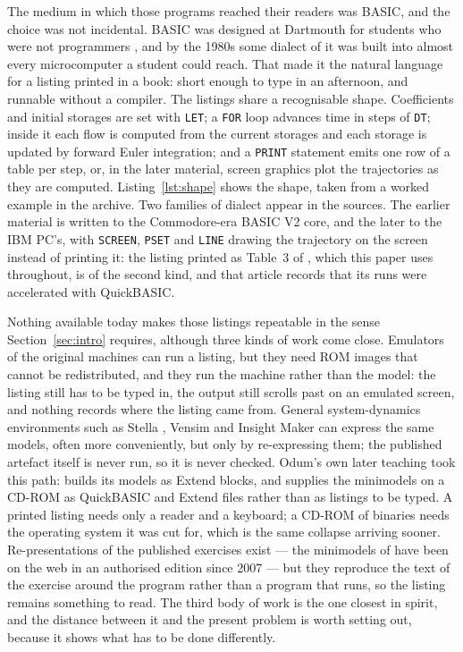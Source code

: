 The medium in which those programs reached their readers was BASIC, and the choice was not incidental. BASIC was designed at Dartmouth for students who were not programmers \citep{kemenyKurtz1964}, and by the 1980s some dialect of it was built into almost every microcomputer a student could reach. That made it the natural language for a listing printed in a book: short enough to type in an afternoon, and runnable without a compiler. The listings share a recognisable shape. Coefficients and initial storages are set with \texttt{LET}; a \texttt{FOR} loop advances time in steps of \texttt{DT}; inside it each flow is computed from the current storages and each storage is updated by forward Euler integration; and a \texttt{PRINT} statement emits one row of a table per step, or, in the later material, screen graphics plot the trajectories as they are computed. Listing~\ref{lst:shape} shows the shape, taken from a worked example in the archive. Two families of dialect appear in the sources. The earlier material is written to the Commodore-era BASIC V2 core, and the later to the IBM PC's, with \texttt{SCREEN}, \texttt{PSET} and \texttt{LINE} drawing the trajectory on the screen instead of printing it: the listing printed as Table~3 of \citet{odum1989}, which this paper uses throughout, is of the second kind, and that article records that its runs were accelerated with QuickBASIC.

Nothing available today makes those listings repeatable in the sense Section~\ref{sec:intro} requires, although three kinds of work come close. Emulators of the original machines can run a listing, but they need ROM images that cannot be redistributed, and they run the machine rather than the model: the listing still has to be typed in, the output still scrolls past on an emulated screen, and nothing records where the listing came from. General system-dynamics environments such as Stella \citep{richmond1985}, Vensim \citep{vensim} and Insight Maker \citep{fortmannRoe2014} can express the same models, often more conveniently, but only by re-expressing them; the published artefact itself is never run, so it is never checked. Odum's own later teaching took this path: \citet{odumOdum2000} builds its models as Extend blocks, and supplies the minimodels on a CD-ROM as QuickBASIC and Extend files rather than as listings to be typed. A printed listing needs only a reader and a keyboard; a CD-ROM of binaries needs the operating system it was cut for, which is the same collapse arriving sooner. Re-presentations of the published exercises exist --- the minimodels of \citet{odumMinimodels} have been on the web in an authorised edition since 2007 \citep{ortega2007} --- but they reproduce the text of the exercise around the program rather than a program that runs, so the listing remains something to read. The third body of work is the one closest in spirit, and the distance between it and the present problem is worth setting out, because it shows what has to be done differently.

